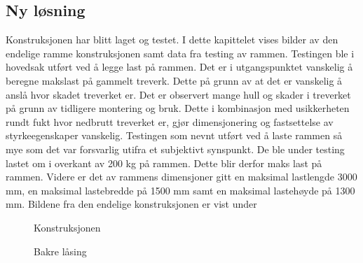 \subsection{Ny løsning}
Konstruksjonen har blitt laget og testet. I dette kapittelet vises bilder av den endelige ramme konstruksjonen samt data fra testing av rammen. 
Testingen ble i hovedsak utført ved å legge last på rammen. Det er i utgangspunktet vanskelig å beregne makslast på gammelt treverk. Dette på grunn av at det er vanskelig å anslå hvor skadet treverket er. Det er observert mange hull og skader i treverket på grunn av tidligere montering og bruk. Dette i kombinasjon med usikkerheten rundt fukt hvor nedbrutt treverket er, gjør dimensjonering og fastsettelse av styrkeegenskaper vanskelig.
Testingen som nevnt utført ved å laste rammen så mye som det var forsvarlig utifra et subjektivt synspunkt. De ble under testing lastet om i overkant av 200 kg på rammen. Dette blir derfor maks last på rammen. Videre er det av rammens dimensjoner gitt en maksimal lastlengde 3000 mm, en maksimal lastebredde på 1500 mm samt en maksimal lastehøyde på 1300 mm.
Bildene fra den endelige konstruksjonen er vist under     
\begin{figure}[H]
\centering   
{}
\caption{Konstruksjonen}
\label{B1}
\end{figure}
\begin{figure}[H]
\centering   
{}
\caption{Bakre låsing}
\label{B2}
\end{figure}
